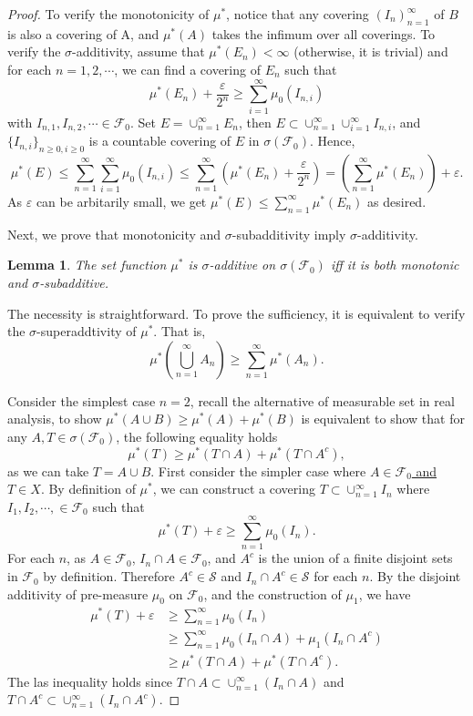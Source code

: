 \documentclass[11pt,english]{smfart}
\newtheorem{lemma}[theorem]{Lemma}
\newcommand{\mc}{\mathcal}
\begin{document}
\begin{proof}
    To verify the monotonicity of $\mu^*$, notice that any covering $(I_n)_{n=1}^\infty$ of $B$ is also a covering of A, and $\mu^*(A)$ takes the infimum over all coverings. To verify the $\sigma$-additivity, assume that $\mu^*(E_n) < \infty$ (otherwise, it is trivial) and for each $n=1,2,\cdots$, we can find a covering of $E_n$ such that $$\mu^*(E_n) + \frac{\varepsilon}{2^n} \geq \sum_{i=1}^\infty \mu_0(I_{n,i})$$ with $I_{n,1},I_{n,2},\cdots \in \mc{F}_0$. Set $E = \cup_{n=1}^\infty E_n$, then $E \subset \cup_{n=1}^\infty \cup_{i=1}^\infty I_{n,i}$, and $\{I_{n,i}\}_{n\geq 0, i\geq 0}$ is a countable covering of $E$ in $\sigma(\mc{F}_0)$. Hence, 
    $$\mu^*(E) \leq \sum_{n=1}^\infty \sum_{i=1}^\infty \mu_0(I_{n,i}) \leq \sum_{n=1}^\infty \left(\mu^*(E_n) + \frac{\varepsilon}{2^n}\right)= \left(\sum_{n=1}^\infty \mu^*(E_n)\right) + \varepsilon. $$
    As $\varepsilon$ can be arbitarily small, we get $\mu^*(E) \leq \sum_{n=1}^\infty \mu^*(E_n)$ as desired.

    Next, we prove that monotonicity and $\sigma$-subadditivity imply $\sigma$-additivity. \\

    \begin{lemma}
        The set function $\mu^*$ is $\sigma$-additive on $\sigma(\mc{F}_0)$ iff it is both monotonic and $\sigma$-subadditive.  
    \end{lemma}

    The necessity is straightforward. To prove the sufficiency, it is equivalent to verify the $\sigma$-superaddtivity of $\mu^*$. That is, 
    $$\mu^*\left(\bigcup_{n=1}^\infty A_n\right)\geq \sum_{n=1}^\infty \mu^*(A_n).$$
    
    Consider the simplest case $n=2$, recall the alternative of measurable set in real analysis, to show $\mu^*(A \cup B) \geq \mu^*(A) + \mu^*(B)$ is equivalent to show that for any $A,T \in \sigma(\mc{F}_0)$, the following equality holds 
    $$\mu^*(T) \geq \mu^*(T\cap A) + \mu^*(T\cap A^c) ,$$
    as we can take $T = A \cup B$. First consider the simpler case where \underline{$A\in \mc{F}_0$ and $T\in X$}. By definition of $\mu^*$, we can construct a covering $T\subset \cup_{n=1}^\infty I_n$ where $I_1,I_2,\cdots, \in \mc{F}_0$ such that $$\mu^*(T) + \varepsilon \geq \sum_{n=1}^\infty \mu_0(I_n).$$
    For each $n$, as $A\in \mc{F}_0$, $I_n\cap A \in \mc{F}_0$, and $A^c$ is the union of a finite disjoint sets in $\mc{F}_0$ by definition. Therefore $A^c \in \mc{S}$ and $I_n \cap A^c \in \mc{S}$ for each $n$. By the disjoint additivity of pre-measure $\mu_0$ on $\mc{F}_0$, and the construction of $\mu_1$, we have 
    \begin{align*}
        \mu^*(T) + \varepsilon &\geq \sum_{n=1}^\infty \mu_0(I_n)\\
        &\geq \sum_{n=1}^\infty \mu_0(I_n \cap A) + \mu_1(I_n \cap A^c) \\
        &\geq \mu^*(T\cap A) + \mu^*(T\cap A^c).
    \end{align*}
    The las inequality holds since $T\cap A \subset \cup_{n=1}^\infty (I_n \cap A)$ and $T \cap A^c \subset \cup_{n=1}^\infty (I_n \cap A^c)$.


\end{proof}
\end{document}
